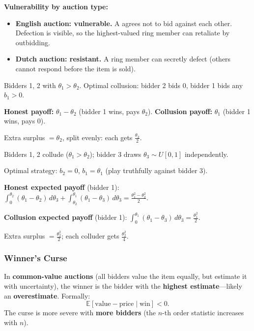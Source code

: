 \textbf{Vulnerability by auction type:}
\begin{itemize}
  \item \textbf{English auction: vulnerable.} A  agrees not to bid against each other. Defection is visible, so the highest-valued ring member can retaliate by outbidding.
  \item \textbf{Dutch auction: resistant.} A ring member can secretly defect (others cannot respond before the item is sold).
\end{itemize}

\begin{exbox}
Bidders 1, 2 with $\theta_1 > \theta_2$. Optimal collusion: bidder 2 bids 0, bidder 1 bids any $b_1 > 0$.

\textbf{Honest payoff:} $\theta_1 - \theta_2$ (bidder 1 wins, pays $\theta_2$). \textbf{Collusion payoff:} $\theta_1$ (bidder 1 wins, pays 0).

Extra surplus $= \theta_2$, split evenly: each gets $\frac{\theta_2}{2}$.
\end{exbox}

\begin{exbox}
Bidders 1, 2 collude ($\theta_1 > \theta_2$); bidder 3 draws $\theta_3 \sim U[0,1]$ independently.

Optimal strategy: $b_2 = 0$, $b_1 = \theta_1$ (play truthfully against bidder 3).

\textbf{Honest expected payoff} (bidder 1): $\displaystyle\int_0^{\theta_2}(\theta_1 - \theta_2)\,d\theta_3 + \int_{\theta_2}^{\theta_1}(\theta_1 - \theta_3)\,d\theta_3 = \frac{\theta_1^2 - \theta_2^2}{2}$.

\textbf{Collusion expected payoff} (bidder 1): $\displaystyle\int_0^{\theta_1}(\theta_1 - \theta_3)\,d\theta_3 = \frac{\theta_1^2}{2}$.

Extra surplus $= \frac{\theta_2^2}{2}$; each colluder gets $\frac{\theta_2^2}{4}$.
\end{exbox}

\separator

\subsubsection{Winner's Curse}

\begin{defbox}
In \textbf{common-value auctions} (all bidders value the item equally, but estimate it with uncertainty), the winner is the bidder with the \textbf{highest estimate}---likely an \textbf{overestimate}. Formally:
\[
  \mathbb{E}[\text{value} - \text{price} \mid \text{win}] < 0.
\]
The curse is more severe with \textbf{more bidders} (the $n$-th order statistic increases with $n$).
\end{defbox}

